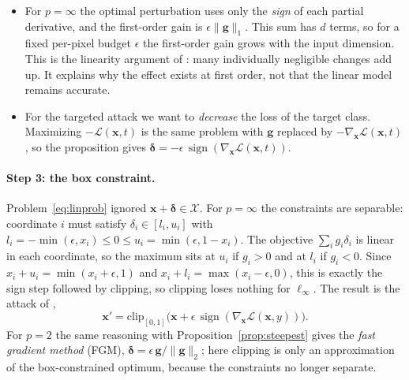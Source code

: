 \documentclass[10pt,a4paper]{extarticle}
\theoremstyle{definition}
\newcommand{\X}{\mathcal{X}}
\newcommand{\Loss}{\mathcal{L}}
\newcommand{\x}{\mathbf{x}}
\newcommand{\xadv}{\mathbf{x}'}
\newcommand{\bdelta}{\boldsymbol{\delta}}
\DeclareMathOperator{\sign}{sign}
\begin{document}
\begin{itemize}
  \item For \(p=\infty\) the optimal perturbation uses only the \emph{sign} of each partial derivative, and the first-order gain is \(\epsilon\|\mathbf{g}\|_1\). This sum has \(d\) terms, so for a fixed per-pixel budget \(\epsilon\) the first-order gain grows with the input dimension. This is the linearity argument of \citet{goodfellow2015explaining}: many individually negligible changes add up. It explains why the effect exists at first order, not that the linear model remains accurate.
  \item For the targeted attack we want to \emph{decrease} the loss of the target class. Maximizing \(-\Loss(\x,t)\) is the same problem with \(\mathbf{g}\) replaced by \(-\nabla_{\x}\Loss(\x,t)\), so the proposition gives \(\bdelta=-\epsilon\,\sign(\nabla_{\x}\Loss(\x,t))\).
\end{itemize}

\paragraph{Step 3: the box constraint.} Problem~\eqref{eq:linprob} ignored \(\x+\bdelta\in\X\). For \(p=\infty\) the constraints are separable: coordinate \(i\) must satisfy \(\delta_i\in[l_i,u_i]\) with \(l_i=-\min(\epsilon,x_i)\le0\le u_i=\min(\epsilon,1-x_i)\). The objective \(\sum_ig_i\delta_i\) is linear in each coordinate, so the maximum sits at \(u_i\) if \(g_i>0\) and at \(l_i\) if \(g_i<0\). Since \(x_i+u_i=\min(x_i+\epsilon,1)\) and \(x_i+l_i=\max(x_i-\epsilon,0)\), this is exactly the sign step followed by clipping, so clipping loses nothing for \(\ell_\infty\). The result is the attack of \citet{goodfellow2015explaining},
\begin{equation}\label{eq:fgsm}
\xadv = \mathrm{clip}_{[0,1]}\big(\x + \epsilon\,\sign(\nabla_{\x}\Loss(\x,y))\big).
\end{equation}
For \(p=2\) the same reasoning with Proposition~\ref{prop:steepest} gives the \emph{fast gradient method} (FGM), \(\bdelta=\epsilon\,\mathbf{g}/\|\mathbf{g}\|_2\); here clipping is only an approximation of the box-constrained optimum, because the constraints no longer separate.
\end{document}
